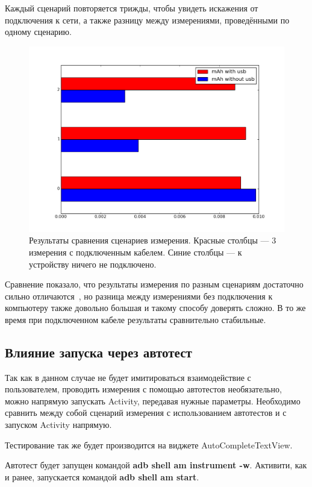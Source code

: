 \documentclass[a4paper,14pt]{extarticle} %
\begin{document}
	Каждый сценарий повторяется трижды, чтобы увидеть искажения от подключения к сети, а также разницу между измерениями, проведёнными по одному сценарию.
	
	\begin{figure}[tbh]
		\includegraphics[width=\textwidth]{usb_comparation}
		\caption{Результаты сравнения сценариев измерения. Красные столбцы --- 3 измерения с подключенным кабелем. Синие столбцы --- к устройству ничего не подключено.}
		\label{fig:usb_comparation}
	\end{figure}

	Сравнение показало, что результаты измерения по разным сценариям достаточно сильно отличаются~\ris{\ref{fig:usb_comparation}}, но разница между измерениями без подключения к компьютеру также довольно большая и такому способу доверять сложно. В то же время при подключенном кабеле результаты сравнительно стабильные.
	
	\subsection{Влияние запуска через автотест}
	
	Так как в данном случае не будет имитироваться взаимодействие с пользователем, проводить измерения с помощью автотестов необязательно, можно напрямую запускать Activity, передавая нужные параметры. Необходимо сравнить между собой сценарий измерения с использованием автотестов и с запуском Activity напрямую.
	
	Тестирование так же будет производится на виджете AutoCompleteTextView.
	
	Автотест будет запущен командой \textbf{adb shell am instrument -w}. Активити, как и ранее, запускается командой \textbf{adb shell am start}.
	
\end{document}
